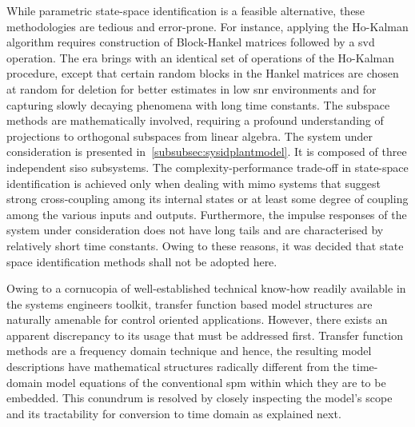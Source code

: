 While  parametric state-space  identification is  a feasible  alternative, these
methodologies  are   tedious  and   error-prone.  For  instance,   applying  the
Ho-Kalman  algorithm requires  construction  of  Block-Hankel matrices  followed
by  a  \gls{svd} operation.  The  \gls{era}  brings  with  an identical  set  of
operations  of  the  Ho-Kalman  procedure, except  that  certain  random  blocks
in  the  Hankel   matrices  are  chosen  at  random  for   deletion  for  better
estimates  in  low \gls{snr}  environments  and  for capturing  slowly  decaying
phenomena  with long  time constants.  The subspace  methods are  mathematically
involved,  requiring  a  profound  understanding of  projections  to  orthogonal
subspaces  from linear  algebra.  The system  under  consideration is  presented
in~\cref{subsubsec:sysidplantmodel}.  It   is  composed  of   three  independent
\gls{siso}  subsystems.  The  complexity-performance  trade-off  in  state-space
identification  is  achieved only  when  dealing  with \gls{mimo}  systems  that
suggest strong cross-coupling among its internal  states or at least some degree
of  coupling among  the various  inputs  and outputs.  Furthermore, the  impulse
responses of  the system under  consideration does not  have long tails  and are
characterised by relatively short time constants. Owing to these reasons, it was
decided that state space identification methods shall not be adopted here.

Owing to a  cornucopia of well-established technical  know-how readily available
in the systems  engineers toolkit, transfer function based  model structures are
naturally amenable for  control oriented applications. However,  there exists an
apparent  discrepancy  to its  usage  that  must  be addressed  first.  Transfer
function  methods are  a frequency  domain  technique and  hence, the  resulting
model  descriptions have  mathematical structures  radically different  from the
time-domain model equations of the  conventional \gls{spm} within which they are
to be  embedded. This conundrum  is resolved  by closely inspecting  the model's
scope and its tractability for conversion to time domain as explained next.

